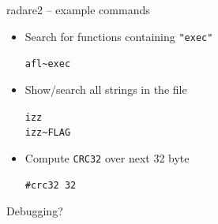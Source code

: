 \begin{frame}[fragile]
  {radare2 -- example commands}

  \begin{itemize}
    \item Search for functions containing \verb+"exec"+ \\
      \begin{center}
        \verb!afl~exec!
      \end{center}
    \item Show/search all strings in the file \\
      \begin{center}
        \texttt{izz} \\
        \verb!izz~FLAG!
      \end{center}
    \item Compute \texttt{CRC32} over next 32 byte \\
      \begin{center}
        \verb+#crc32 32+
      \end{center}
  \end{itemize}

\end{frame}


\begin{frame}[plain]
	\begin{center}
    \huge Debugging?
	\end{center}
\end{frame}


